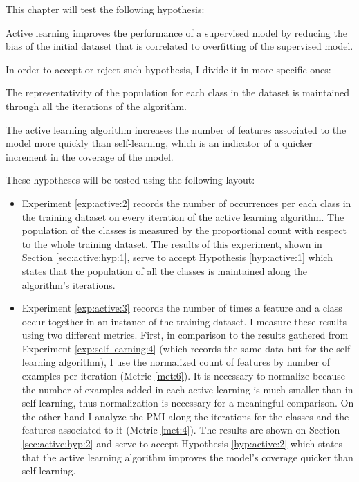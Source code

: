 This chapter will test the following hypothesis:

\begin{hypothesis}\label{hyp:active}
  Active learning improves the performance of a supervised model by reducing
  the bias of the initial dataset that is correlated to overfitting of the
  supervised model.
\end{hypothesis}

In order to accept or reject such hypothesis, I divide it in more specific
ones:

\begin{subhypothesis}\label{hyp:active:1}
  The representativity of the population for each class in the dataset is
  maintained through all the iterations of the algorithm.
\end{subhypothesis}

\begin{subhypothesis}\label{hyp:active:2}
  The active learning algorithm increases the number of features associated to
  the model more quickly than self-learning, which is an indicator of a quicker
  increment in the coverage of the model.
\end{subhypothesis}

These hypotheses will be tested using the following layout:

\begin{itemize}
  \item Experiment \ref{exp:active:2} records the number of occurrences per
    each class in the training dataset on every iteration of the active
    learning algorithm. The population of the classes is measured by the
    proportional count with respect to the whole training dataset. The results
    of this experiment, shown in Section \ref{sec:active:hyp:1}, serve to
    accept Hypothesis \ref{hyp:active:1} which states that the population of
    all the classes is maintained along the algorithm's iterations.
  \item Experiment \ref{exp:active:3} records the number of times a feature and
    a class occur together in an instance of the training dataset. I measure
    these results using two different metrics. First, in comparison to the
    results gathered from Experiment \ref{exp:self-learning:4} (which records
    the same data but for the self-learning algorithm), I use the normalized
    count of features by number of examples per iteration (Metric \ref{met:6}).
    It is necessary to normalize because the number of examples added in each
    active learning is much smaller than in self-learning, thus normalization
    is necessary for a meaningful comparison. On the other hand I analyze the
    PMI along the iterations for the classes and the features associated to it
    (Metric \ref{met:4}). The results are shown on Section
    \ref{sec:active:hyp:2} and serve to accept Hypothesis \ref{hyp:active:2}
    which states that the active learning algorithm improves the model's
    coverage quicker than self-learning.
\end{itemize}

